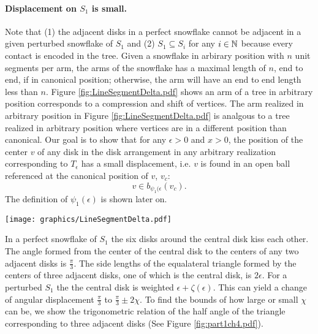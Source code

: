 
\paragraph{Displacement on $S_1$ is small.}
Note that (1) the adjacent disks in a perfect snowflake cannot be adjacent in a given perturbed snowflake of $S_1$ and (2) $S_1 \subseteq S_i$ for any $i \in {\mathbb{N}}$ because every contact is encoded in the tree.  
Given a snowflake in arbirary position with $n$ unit segments per arm, the arms of the snowflake has a maximal length of $n$, end to end, if in canonical position; otherwise, the arm will have an end to end length less than $n$.  
Figure \ref{fig:LineSegmentDelta.pdf} shows an arm of a tree in arbitrary position corresponds to a compression and shift of vertices.  
The arm realized in arbitrary position in Figure \ref{fig:LineSegmentDelta.pdf} is analgous to a tree realized in arbitrary position where vertices are in a different position than canonical.  
Our goal is to show that for any $\epsilon >0$ and $x >0$, the position of the center $v$ of any disk in the disk arrangement in any arbitrary realization corresponding to $T_\epsilon$ has a small displacement, i.e. $v$ is found in an open ball referenced at the canonical position of $v$, $v_c$: $$v \in b_{\psi_1(\epsilon}(v_c).$$ 
The definition of $\psi_1(\epsilon)$ is shown later on.


\begin{minipage}{\linewidth}
\begin{center}
\texttt{[image: graphics/LineSegmentDelta.pdf]}
\label{fig:LineSegmentDelta.pdf}
\end{center}
\end{minipage}
 
In a perfect snowflake of $S_1$ the six disks around the central disk kiss each other.  
The angle formed from the center of the central disk to the centers of any two adjacent disks is $\frac{\pi}{3}$.  
The side lengths of the equalateral triangle formed by the centers of three adjacent disks, one of which is the central disk, is $2\epsilon$.  
For a perturbed $S_1$ the the central disk is weighted $\epsilon+ \zeta(\epsilon)$.  
This can yield a change of angular displacement $\frac{\pi}{3}$ to $\frac{\pi}{3} \pm 2\chi$.  
To find the bounds of how large or small $\chi$ can be, we show the trigonometric relation of the half angle of the triangle corresponding to three adjacent disks (See Figure \ref{fig:part1ch4.pdf}).

